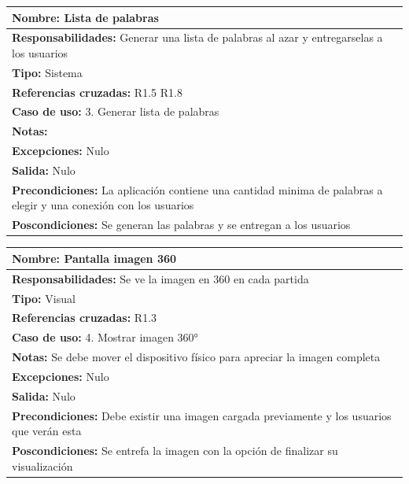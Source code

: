 \begin{table}[H]
    \begin{center}
        \begin{tabular}{| m{15cm} |}            
        	\hline 
        	\textbf{Nombre:} Lista de palabras \\
        	\hline
        	\textbf{Responsabilidades:} Generar una lista de palabras al azar y entregarselas a los usuarios\\
        	\hline
        	\textbf{Tipo:} Sistema\\
        	\hline
        	\textbf{Referencias cruzadas:} R1.5 R1.8\\
        	\hline
        	\textbf{Caso de uso:} 3. Generar lista de palabras\\
        	\hline
        	\textbf{Notas:} \\
        	\hline
        	\textbf{Excepciones:} Nulo \\
        	\hline
        	\textbf{Salida:} Nulo\\
        	\hline
        	\textbf{Precondiciones:} La aplicación contiene una cantidad minima de palabras a elegir y una conexión con los usuarios\\
        	\hline
        	\textbf{Poscondiciones:} Se generan las palabras y se entregan a los usuarios\\
        	\hline
        \end{tabular}
    \end{center}
\end{table}

\begin{table}[H]
    \begin{center}
        \begin{tabular}{| m{15cm} |}       
        	\hline 
        	\textbf{Nombre:} Pantalla imagen 360\\
        	\hline
        	\textbf{Responsabilidades:} Se ve la imagen en 360 en cada partida \\
        	\hline
        	\textbf{Tipo:} Visual\\
        	\hline
        	\textbf{Referencias cruzadas:} R1.3\\
        	\hline
        	\textbf{Caso de uso:} 4. Mostrar imagen 360°\\
        	\hline
        	\textbf{Notas:} Se debe mover el dispositivo físico para apreciar la imagen completa\\
        	\hline
        	\textbf{Excepciones:} Nulo \\
        	\hline
        	\textbf{Salida:} Nulo \\
        	\hline
        	\textbf{Precondiciones:} Debe existir una imagen cargada previamente y los usuarios que verán esta \\
        	\hline
        	\textbf{Poscondiciones:} Se entrefa la imagen con la opción de finalizar su visualización\\
        	\hline
        \end{tabular}
    \end{center}
\end{table}

